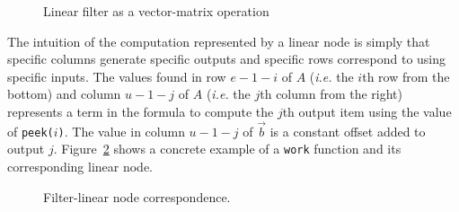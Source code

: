 \begin{figure}[t]
\vspace{-6pt}
\center
\epsfxsize=3.0in
\vspace{-12pt}
\caption{Linear filter as a vector-matrix operation}
\label{fig:overview-matrix}
\vspace{-6pt}
\end{figure}

The intuition of the computation represented by a linear node is
simply that specific columns generate specific outputs and specific
rows correspond to using specific inputs.  The values found in row
$e-1-i$ of $A$ ({\it i.e.} the $i$th row from the bottom) and 
column $u-1-j$ of $A$ ({\it i.e.} the $j$th column from the right) 
represents a term in the formula to compute the $j$th output item using 
the value of {\tt peek($i$)}. The value in column $u-1-j$ of 
$\vec{b}$ is a constant offset added to output $j$.
Figure~\ref{fig:linear-node-example} shows a concrete example
of a {\tt work} function and its corresponding linear node.

\begin{figure}
\center
\epsfxsize=2.0in
\vspace{-12pt}
\caption{Filter-linear node correspondence.}
\label{fig:linear-node-example}
\vspace{-12pt}
\end{figure}
